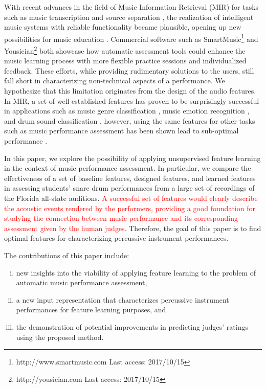 \documentclass[conference]{IEEEtran}
\begin{document}
With recent advances in the field of Music Information Retrieval (MIR) for tasks such as music transcription \cite{Benetos2013} and source separation \cite{Huang2014}, the realization of intelligent music systems with reliable functionality became plausible, opening up new possibilities for music education \cite{Dittmar2012}. Commercial software such as SmartMusic\footnote{http://www.smartmusic.com Last access: 2017/10/15} and Yousician\footnote{http://yousician.com Last access: 2017/10/15} both showcase how automatic assessment tools could enhance the music learning process with more flexible practice sessions and individualized feedback. These efforts, while providing rudimentary solutions to the users, still fall short in characterizing non-technical aspects of a performance. We hypothesize that this limitation originates from the design of the audio features. In MIR, a set of well-established features has proven to be surprisingly successful in applications such as music genre classification \cite{Tzanetakis2002}, music emotion recognition \cite{Kim2010}, and drum sound classification \cite{Herrera2003}, however, using the same features for other tasks such as music performance assessment has been shown lead to sub-optimal performance \cite{Wu2016, Vidwans2017}. %

In this paper, we explore the possibility of applying unsupervised feature learning in the context of music performance assessment. In particular, we compare the effectiveness of a set of baseline features, designed features, and learned features in assessing students' snare drum performances from a large set of recordings of the Florida all-state auditions. 
{\textcolor{red}{A successful set of features would clearly describe the acoustic events rendered by the performers, providing a good foundation for studying the connection between music performance and its corresponding assessment given by the human judges.}}
Therefore, the goal of this paper is to find optimal features for characterizing percussive instrument performances.

The contributions of this paper include:
\begin{enumerate}[(i)]
	\item   new insights into the viability of applying feature learning to the problem of automatic music performance assessment, 
    \item   a new input representation that characterizes percussive instrument performances for feature learning purposes, and 
    \item   the demonstration of potential improvements in predicting judges' ratings using the proposed method.
\end{enumerate} 
\end{document}
